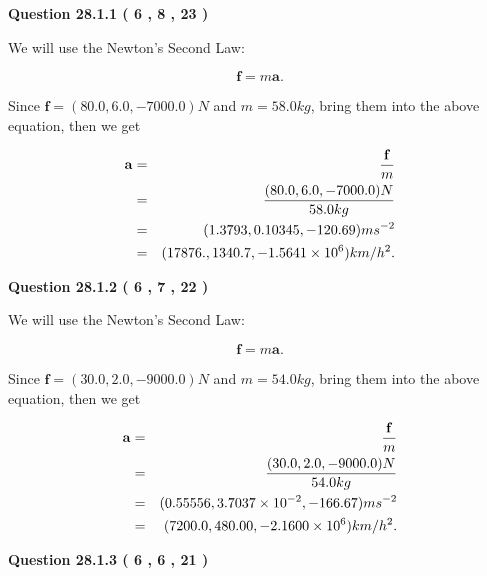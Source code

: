 \documentclass[12pt]{article}
\begin{document}
   
  
\vspace{0.2in}
  
{\textbf{\Large{Question
28.1.1 
 (           6 ,           8 ,          23 )
}}}
  
  
 
 

We will use the Newton's Second Law:
 
\[
\mathbf{f}=m\mathbf{a}.
\]
 
Since $\mathbf{f}=( %
80.0,  %
6.0,  %
-7000.0 )N$
and $m= %
58.0kg$, bring them into the above equation, then we get
 
\begin{eqnarray*}
\mathbf{a}&=&\frac{\mathbf{f}}m  \\
&=&\frac{(
80.0 ,
6.0 ,
-7000.0 )N
}{ %
58.0 kg}  \\
&=&(
1.3793 ,
0.10345,
-120.69
)ms^{-2} \\
&=&(
17876. ,
1340.7 ,
-1.5641 \times 10^{6}
)km/h^2.
\end{eqnarray*}
 
 
 
  
\vspace{0.2in}
  
{\textbf{\Large{Question
28.1.2 
 (           6 ,           7 ,          22 )
}}}
  
  
 
 

We will use the Newton's Second Law:
 
\[
\mathbf{f}=m\mathbf{a}.
\]
 
Since $\mathbf{f}=( %
30.0,  %
2.0,  %
-9000.0 )N$
and $m= %
54.0 kg$, bring them into the above equation, then we get
 
\begin{eqnarray*}
\mathbf{a}&=&\frac{\mathbf{f}}m  \\
&=&\frac{(
30.0 ,
2.0 ,
-9000.0 )N
}{ %
54.0 kg}  \\
&=&(
0.55556 ,
3.7037 \times 10^{-2},
-166.67
)ms^{-2} \\
&=&(
7200.0 ,
480.00 ,
-2.1600 \times 10^{6}
)km/h^2.
\end{eqnarray*}
 
 
 
  
\vspace{0.2in}
  
{\textbf{\Large{Question
28.1.3 
 (           6 ,           6 ,          21 )
}}}
  
  
 
\end{document}
